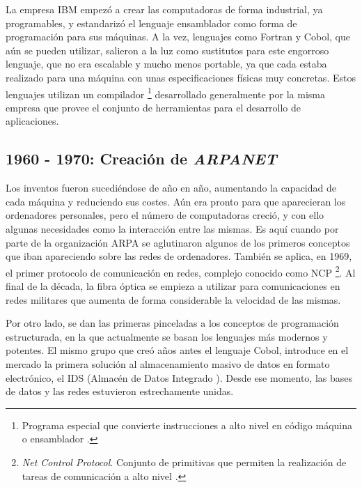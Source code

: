 La empresa IBM empezó a crear las computadoras de forma industrial, ya 
programables, y estandarizó el lenguaje ensamblador \cite{Ensamblador} 
como forma de programación para sus máquinas. A la vez, lenguajes 
como Fortran y Cobol, que aún se pueden utilizar, salieron a la luz 
como sustitutos para este engorroso lenguaje, que no era escalable y mucho menos 
portable, ya que cada \software estaba realizado para una máquina con 
unas especificaciones físicas muy concretas. Estos lenguajes 
utilizan un compilador \footnote{Programa especial que convierte 
instrucciones a alto nivel en código máquina o ensamblador 
\cite{Ensamblador}.} desarrollado generalmente por la misma empresa 
que provee el conjunto de herramientas para el desarrollo de 
aplicaciones.

\subsection{1960 - 1970: Creación de \emph{ARPANET} }
Los inventos fueron sucediéndose de año en año, aumentando la 
capacidad de cada máquina y reduciendo sus costes. Aún era pronto 
para que aparecieran los ordenadores personales, pero el número de 
computadoras creció, y con ello algunas necesidades como la interacción 
entre las mismas. Es aquí cuando por parte de la organización ARPA 
se aglutinaron algunos de los primeros conceptos que iban apareciendo sobre 
las redes de ordenadores. También se aplica, en 1969, el primer 
protocolo de comunicación en redes, complejo conocido como NCP 
\footnote{\emph{Net Control Protocol}. Conjunto de primitivas que 
permiten la realización de tareas de comunicación a alto nivel 
\cite{Tanenbaum}.}. Al final de la década, la fibra óptica se 
empieza a utilizar para comunicaciones en redes militares que aumenta 
de forma considerable la velocidad de las mismas.

Por otro lado, se dan las primeras pinceladas a los conceptos de 
programación estructurada, en la que actualmente se basan los 
lenguajes más modernos y potentes. El mismo grupo que creó años 
antes el lenguaje Cobol, introduce en el mercado la primera solución 
al almacenamiento masivo de datos en formato electrónico, el IDS 
(Almacén de Datos Integrado \cite{WDatabase}). Desde ese momento, las 
bases de datos y las redes estuvieron estrechamente unidas.

